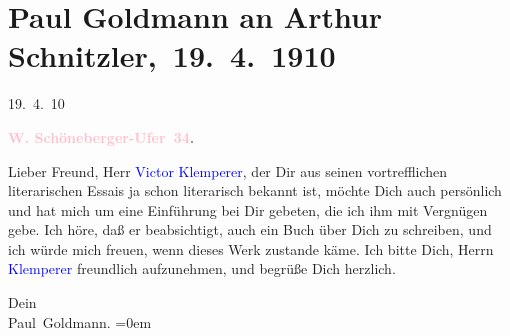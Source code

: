 

\renewcommand{\erwaehntePersonen}{Personen: Victor Klemperer}
\renewcommand{\erwaehnteOrte}{Orte: Berlin, Schöneberger Ufer, Wien}
\renewcommand{\erwaehnteWerke}{}
\section[ Paul Goldmann an Arthur Schnitzler, 19. 4. 1910]{Paul Goldmann an Arthur Schnitzler, 19. 4. 1910}
\nopagebreak{}
\rehead{ }\normalsize\beginnumbering{}
\toendnotes[C]{\smallbreak\pagebreak[2]}
\toendnotes[C]{\smallbreak}
\pstart
           \raggedleft{}{\pb}19. 4. 10\pend
           
\pstart
           \raggedleft{}\textcolor{gray}{\textbf{\textcolor{pink}{W. Schöneberger-Ufer 34}{}\ledrightnote{\textcolor{pink}{Schöneberger Ufer}}.}}\pend
           
\pstart{}Lieber Freund,\pend
\pstart
           Herr \textcolor{blue}{Victor Klemperer}{}\ledrightnote{\textcolor{blue}{Victor Klemperer}}, der Dir aus seinen
               vortrefflichen literarischen Essais ja schon literarisch bekannt ist, möchte Dich
               auch persönlich \label{K_L03470-1v}\label{K_L03470-1h} und hat mich um eine Einführung bei Dir gebeten, die ich ihm mit
               Vergnügen gebe. Ich höre, daß er beabsichtigt, auch ein Buch über Dich zu schreiben,
               und ich würde mich freuen, wenn dieses Werk zustande käme. Ich bitte Dich, Herrn \textcolor{blue}{Klemperer}{}\ledrightnote{\textcolor{blue}{Victor Klemperer}} freundlich aufzunehmen, und begrüße
               Dich herzlich.\pend
           
\pstart
           Dein {\\[\baselineskip]}\spacefill\mbox{Paul Goldmann.}\pend
           \leftskip=0em{}\endnumbering{}
\begin{anhang}
\end{anhang}
      